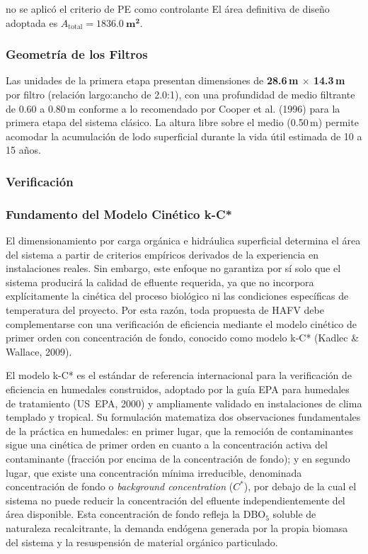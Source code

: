 \documentclass[12pt,a4paper]{article}
\begin{document}
no se aplicó el criterio de PE como controlante El área definitiva de diseño adoptada es $A_\text{total} = \mathbf{1836.0\ \text{m}^2}$.

\subsubsection*{Geometría de los Filtros}

Las unidades de la primera etapa presentan dimensiones de \textbf{28.6\,m $\times$ 14.3\,m} por filtro (relación largo:ancho de 2.0:1), con una profundidad de medio filtrante de 0.60 a 0.80\,m conforme a lo recomendado por Cooper et al. (1996) para la primera etapa del sistema clásico. La altura libre sobre el medio (0.50\,m) permite acomodar la acumulación de lodo superficial durante la vida útil estimada de 10 a 15 años.


\subsubsection{Verificación}

\subsubsection*{Fundamento del Modelo Cinético k-C*}

El dimensionamiento por carga orgánica e hidráulica superficial determina el área del sistema a partir de criterios empíricos derivados de la experiencia en instalaciones reales. Sin embargo, este enfoque no garantiza por sí solo que el sistema producirá la calidad de efluente requerida, ya que no incorpora explícitamente la cinética del proceso biológico ni las condiciones específicas de temperatura del proyecto. Por esta razón, toda propuesta de HAFV debe complementarse con una verificación de eficiencia mediante el modelo cinético de primer orden con concentración de fondo, conocido como modelo k-C* (Kadlec \& Wallace, 2009).

El modelo k-C* es el estándar de referencia internacional para la verificación de eficiencia en humedales construidos, adoptado por la guía EPA para humedales de tratamiento (US~EPA, 2000) y ampliamente validado en instalaciones de clima templado y tropical. Su formulación matematiza dos observaciones fundamentales de la práctica en humedales: en primer lugar, que la remoción de contaminantes sigue una cinética de primer orden en cuanto a la concentración activa del contaminante (fracción por encima de la concentración de fondo); y en segundo lugar, que existe una concentración mínima irreducible, denominada concentración de fondo o \textit{background concentration} ($C^*$), por debajo de la cual el sistema no puede reducir la concentración del efluente independientemente del área disponible. Esta concentración de fondo refleja la DBO$_5$ soluble de naturaleza recalcitrante, la demanda endógena generada por la propia biomasa del sistema y la resuspensión de material orgánico particulado.
\end{document}

